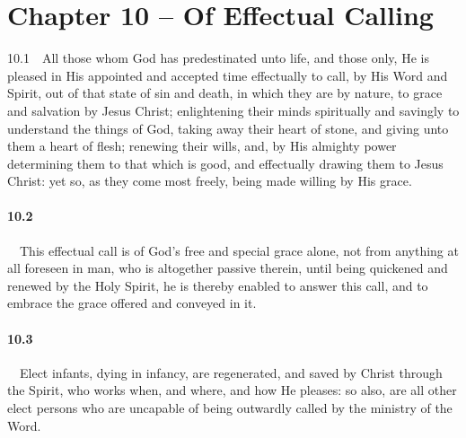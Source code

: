 \section{Chapter 10 -- Of Effectual Calling} 10.1\ \ All those whom God has predestinated unto life, and those only, He is pleased in His appointed and accepted time effectually to call, by His Word and Spirit, out of that state of sin and death, in which they are by nature, to grace and salvation by Jesus Christ; enlightening their minds spiritually and savingly to understand the things of God, taking away their heart of stone, and giving unto them a heart of flesh; renewing their wills, and, by His almighty power determining them to that which is good, and effectually drawing them to Jesus Christ: yet so, as they come most freely, being made willing by His grace.   
\bigskip
\paragraph{10.2}\ \ This effectual call is of God's free and special grace alone, not from anything at all foreseen in man, who is altogether passive therein, until being quickened and renewed by the Holy Spirit, he is thereby enabled to answer this call, and to embrace the grace offered and conveyed in it.   
\bigskip
\paragraph{10.3}\ \ Elect infants, dying in infancy, are regenerated, and saved by Christ through the Spirit, who works when, and where, and how He pleases: so also, are all other elect persons who are uncapable of being outwardly called by the ministry of the Word.   
\bigskip
